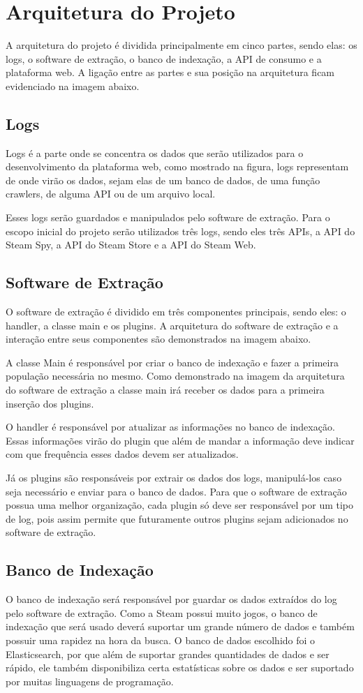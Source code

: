\section*{Arquitetura do Projeto}
A arquitetura do projeto é dividida principalmente em cinco partes, sendo elas: os logs, o software de extração, o banco de indexação, a API de consumo e a plataforma web. A ligação entre as partes e sua posição na arquitetura ficam evidenciado na imagem abaixo.
\subsection*{Logs}
Logs é a parte onde se concentra os dados que serão utilizados para o desenvolvimento da plataforma web, como mostrado na figura, logs representam de onde virão os dados, sejam elas de um banco de dados, de uma função crawlers, de alguma API ou de um arquivo local.

Esses logs serão guardados e manipulados pelo software de extração. Para o escopo inicial do projeto serão utilizados três logs, sendo eles três APIs, a API do Steam Spy, a API do Steam Store e a API do Steam Web.
\subsection*{Software de Extração}
O software de extração é dividido em três componentes principais, sendo eles: o handler, a classe main e os plugins. A arquitetura do software de extração e a interação entre seus componentes são demonstrados na imagem abaixo.

A classe Main é responsável por criar o banco de indexação e fazer a primeira população necessária no mesmo. Como demonstrado na imagem da arquitetura do software de extração a classe main irá receber os dados para a primeira inserção dos plugins.

O handler é responsável por atualizar as informações no banco de indexação. Essas informações virão do plugin que além de mandar a informação deve indicar com que frequência esses dados devem ser atualizados.

Já os plugins são responsáveis por extrair os dados dos logs, manipulá-los caso seja necessário e enviar para o banco de dados. Para que o software de extração possua uma melhor organização, cada plugin só deve ser responsável por um tipo de log, pois assim permite que futuramente outros plugins sejam adicionados no software de extração.
\subsection*{Banco de Indexação}
O banco de indexação será responsável por guardar os dados extraídos do log pelo software de extração. Como a Steam possui muito jogos, o banco de indexação que será usado deverá suportar um grande número de dados e também possuir uma rapidez na hora da busca. O banco de dados escolhido foi o Elasticsearch, por que além de suportar grandes quantidades de dados e ser rápido, ele também disponibiliza certa estatísticas sobre os dados e ser suportado por muitas linguagens de programação.
